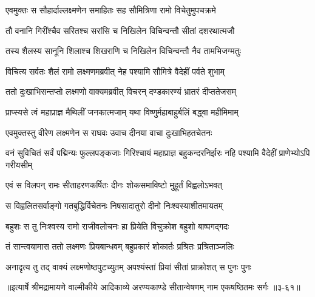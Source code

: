 \twolineshloka
{एवमुक्तः स सौहार्दाल्लक्ष्मणेन समाहितः}
{सह सौमित्रिणा रामो विचेतुमुपचक्रमे} %

\twolineshloka
{तौ वनानि गिरींश्चैव सरितश्च सरांसि च}
{निखिलेन विचिन्वन्तौ सीतां दशरथात्मजौ} %

\twolineshloka
{तस्य शैलस्य सानूनि शिलाश्च शिखराणि च}
{निखिलेन विचिन्वन्तौ नैव तामभिजग्मतुः} %

\twolineshloka
{विचित्य सर्वतः शैलं रामो लक्ष्मणमब्रवीत्}
{नेह पश्यामि सौमित्रे वैदेहीं पर्वते शुभाम्} %

\twolineshloka
{ततो दुःखाभिसन्तप्तो लक्ष्मणो वाक्यमब्रवीत्}
{विचरन् दण्डकारण्यं भ्रातरं दीप्ततेजसम्} %

\twolineshloka
{प्राप्स्यसे त्वं महाप्राज्ञ मैथिलीं जनकात्मजाम्}
{यथा विष्णुर्महाबाहुर्बलिं बद्ध्वा महीमिमाम्} %

\twolineshloka
{एवमुक्तस्तु वीरेण लक्ष्मणेन स राघवः}
{उवाच दीनया वाचा दुःखाभिहतचेतनः} %

\threelineshloka
{वनं सुविचितं सर्वं पद्मिन्यः फुल्लपङ्कजाः}
{गिरिश्चायं महाप्राज्ञ बहुकन्दरनिर्झरः}
{नहि पश्यामि वैदेहीं प्राणेभ्योऽपि गरीयसीम्} %

\twolineshloka
{एवं स विलपन् रामः सीताहरणकर्षितः}
{दीनः शोकसमाविष्टो मुहूर्तं विह्वलोऽभवत्} %

\twolineshloka
{स विह्वलितसर्वाङ्गो गतबुद्धिर्विचेतनः}
{निषसादातुरो दीनो निःश्वस्याशीतमायतम्} %

\twolineshloka
{बहुशः स तु निःश्वस्य रामो राजीवलोचनः}
{हा प्रियेति विचुक्रोश बहुशो बाष्पगद्गदः} %

\twolineshloka
{तं सान्त्वयामास ततो लक्ष्मणः प्रियबान्धवम्}
{बहुप्रकारं शोकार्तः प्रश्रितः प्रश्रिताञ्जलिः} %

\twolineshloka
{अनादृत्य तु तद् वाक्यं लक्ष्मणोष्ठपुटच्युतम्}
{अपश्यंस्तां प्रियां सीतां प्राक्रोशत् स पुनः पुनः} %


॥इत्यार्षे श्रीमद्रामायणे वाल्मीकीये आदिकाव्ये अरण्यकाण्डे सीतान्वेषणम् नाम एकषष्ठितमः सर्गः ॥३-६१॥
